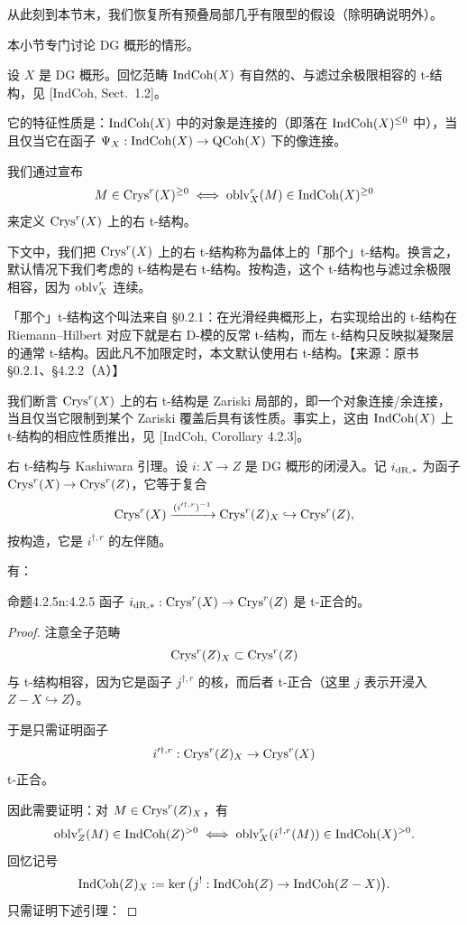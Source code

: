 从此刻到本节末，我们恢复所有预叠局部几乎有限型的假设（除明确说明外）。

本小节专门讨论 DG 概形的情形。

设 $X$ 是 DG 概形。回忆范畴 $\mathrm{IndCoh}(X)$ 有自然的、与滤过余极限相容的 t-结构，见 [IndCoh, Sect.~1.2]。

它的特征性质是：$\mathrm{IndCoh}(X)$ 中的对象是连接的（即落在 $\mathrm{IndCoh}(X)^{\leq 0}$ 中），当且仅当它在函子 $\Psi_X:\mathrm{IndCoh}(X)\to\mathrm{QCoh}(X)$ 下的像连接。

我们通过宣布
\[
M\in\mathrm{Crys}^r(X)^{\geq 0}\iff \mathrm{oblv}^r_X(M)\in\mathrm{IndCoh}(X)^{\geq 0}
\]
来定义 $\mathrm{Crys}^r(X)$ 上的右 t-结构。

下文中，我们把 $\mathrm{Crys}^r(X)$ 上的右 t-结构称为晶体上的「那个」t-结构。换言之，默认情况下我们考虑的 t-结构是右 t-结构。按构造，这个 t-结构也与滤过余极限相容，因为 $\mathrm{oblv}^r_X$ 连续。

\begin{annote}
「那个」t-结构这个叫法来自 §0.2.1：在光滑经典概形上，右实现给出的 t-结构在 Riemann--Hilbert 对应下就是右 D-模的反常 t-结构，而左 t-结构只反映拟凝聚层的通常 t-结构。因此凡不加限定时，本文默认使用右 t-结构。\hfill【来源：原书 §0.2.1、§4.2.2（A）】
\end{annote}


我们断言 $\mathrm{Crys}^r(X)$ 上的右 t-结构是 Zariski 局部的，即一个对象连接/余连接，当且仅当它限制到某个 Zariski 覆盖后具有该性质。事实上，这由 $\mathrm{IndCoh}(X)$ 上 t-结构的相应性质推出，见 [IndCoh, Corollary 4.2.3]。

右 t-结构与 Kashiwara 引理。设 $i:X\to Z$ 是 DG 概形的闭浸入。记 $i_{\mathrm{dR},*}$ 为函子 $\mathrm{Crys}^r(X)\to\mathrm{Crys}^r(Z)$，它等于复合
\[
\mathrm{Crys}^r(X)\xrightarrow{(i'^{\dagger,r})^{-1}}\mathrm{Crys}^r(Z)_X\hookrightarrow\mathrm{Crys}^r(Z),
\]
按构造，它是 $i^{\dagger,r}$ 的左伴随。

有：

\begin{othm}{命题}{4.2.5}{n:4.2.5}
函子 $i_{\mathrm{dR},*}:\mathrm{Crys}^r(X)\to\mathrm{Crys}^r(Z)$ 是 t-正合的。
\end{othm}

\begin{proof}
注意全子范畴
\[
\mathrm{Crys}^r(Z)_X\subset\mathrm{Crys}^r(Z)
\]
与 t-结构相容，因为它是函子 $j^{\dagger,r}$ 的核，而后者 t-正合（这里 $j$ 表示开浸入 $Z-X\hookrightarrow Z$）。

于是只需证明函子
\[
i'^{\dagger,r}:\mathrm{Crys}^r(Z)_X\to\mathrm{Crys}^r(X)
\]
t-正合。

因此需要证明：对 $M\in\mathrm{Crys}^r(Z)_X$，有
\[
\mathrm{oblv}^r_Z(M)\in\mathrm{IndCoh}(Z)^{>0}\iff \mathrm{oblv}^r_X(i^{\dagger,r}(M))\in\mathrm{IndCoh}(X)^{>0}.
\]
回忆记号
\[
\mathrm{IndCoh}(Z)_X:=\ker\big(j^!:\mathrm{IndCoh}(Z)\to\mathrm{IndCoh}(Z-X)\big).
\]
只需证明下述引理：
\end{proof}

